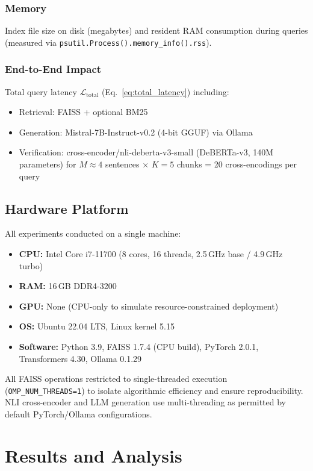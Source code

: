 \documentclass[conference]{IEEEtran}
\begin{document}
\subsubsection{Memory}
Index file size on disk (megabytes) and resident RAM consumption during queries (measured via \texttt{psutil.Process().memory\_info().rss}).

\subsubsection{End-to-End Impact}
Total query latency $\mathcal{L}_{\mathrm{total}}$ (Eq.~\ref{eq:total_latency}) including:
\begin{itemize}
    \item Retrieval: FAISS + optional BM25
    \item Generation: Mistral-7B-Instruct-v0.2 (4-bit GGUF) via Ollama
    \item Verification: cross-encoder/nli-deberta-v3-small (DeBERTa-v3, 140M parameters) for $M{\approx}4$ sentences $\times$ $K{=}5$ chunks = 20 cross-encodings per query
\end{itemize}

\subsection{Hardware Platform}

All experiments conducted on a single machine:
\begin{itemize}
    \item \textbf{CPU:} Intel Core i7-11700 (8 cores, 16 threads, 2.5\,GHz base / 4.9\,GHz turbo)
    \item \textbf{RAM:} 16\,GB DDR4-3200
    \item \textbf{GPU:} None (CPU-only to simulate resource-constrained deployment)
    \item \textbf{OS:} Ubuntu 22.04 LTS, Linux kernel 5.15
    \item \textbf{Software:} Python 3.9, FAISS 1.7.4 (CPU build), PyTorch 2.0.1, Transformers 4.30, Ollama 0.1.29
\end{itemize}

All FAISS operations restricted to single-threaded execution (\texttt{OMP\_NUM\_THREADS=1}) to isolate algorithmic efficiency and ensure reproducibility. NLI cross-encoder and LLM generation use multi-threading as permitted by default PyTorch/Ollama configurations.

\section{Results and Analysis}
\end{document}

